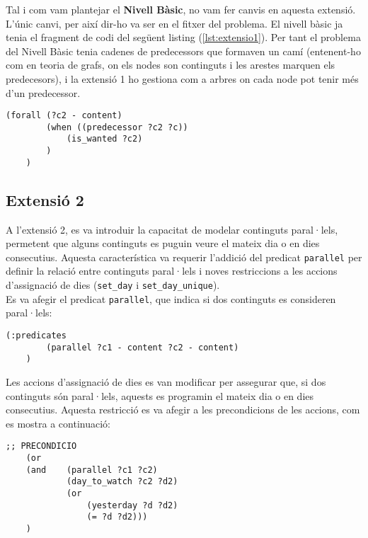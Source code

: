 \documentclass[a4paper]{article}
\begin{document}
	Tal i com vam plantejar el \textbf{Nivell Bàsic}, no vam fer canvis en aquesta extensió. L'únic canvi, per així dir-ho va ser en el fitxer del problema. El nivell bàsic ja tenia el fragment de codi del següent listing (\ref{lst:extensio1}). Per tant el problema del Nivell Bàsic tenia cadenes de predecessors que formaven un camí (entenent-ho com en teoria de grafs, on els nodes son continguts i les arestes marquen els predecesors), i la extensió 1 ho gestiona com a arbres on cada node pot tenir més d'un predecessor. \\
	
	\begin{lstlisting}[language=PDDL, caption={Fragment per assignar més d'un predecessor com a pendent de veure}, label={lst:extensio1}]
	(forall (?c2 - content)
		(when ((predecessor ?c2 ?c))
			(is_wanted ?c2)
		)
	)
	\end{lstlisting}
	
	\subsection{Extensió 2}
	
	A l'extensió 2, es va introduir la capacitat de modelar continguts paral·lels, permetent que alguns continguts es puguin veure el mateix dia o en dies consecutius. Aquesta característica va requerir l'addició del predicat \texttt{parallel} per definir la relació entre continguts paral·lels i noves restriccions a les accions d'assignació de dies (\texttt{set\_day} i \texttt{set\_day\_unique}).\\
	
	Es va afegir el predicat \texttt{parallel}, que indica si dos continguts es consideren paral·lels:
	\begin{lstlisting}[language=PDDL, caption={Definició del predicat \texttt{parallel}}, label={lst:predicatParallel}]
	(:predicates
		(parallel ?c1 - content ?c2 - content)
	)
	\end{lstlisting}
	
	Les accions d'assignació de dies es van modificar per assegurar que, si dos continguts són paral·lels, aquests es programin el mateix dia o en dies consecutius. Aquesta restricció es va afegir a les precondicions de les accions, com es mostra a continuació:
	
	\begin{lstlisting}[language=PDDL, caption={Restriccions per continguts paral·lels}, label={lst:extensio2}]
	;; PRECONDICIO
	(or
	(and 	(parallel ?c1 ?c2)
		 	(day_to_watch ?c2 ?d2)
		 	(or
				(yesterday ?d ?d2)
				(= ?d ?d2)))
	)
	\end{lstlisting}
	
\end{document}
